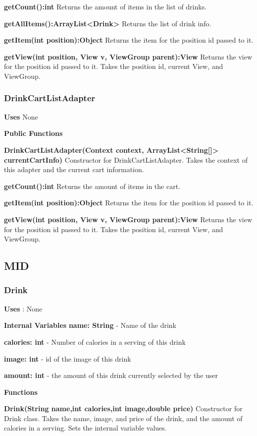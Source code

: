 \documentclass [10pt]{article}
\begin{document}
\textbf{getCount():int}
Returns the amount of items in the list of drinks.

\textbf{getAllItems():ArrayList<Drink>}
Returns the list of drink info.

\textbf{getItem(int position):Object}
Returns the item for the position id passed to it.

\textbf{getView(int position, View v, ViewGroup parent):View}
Returns the view for the position id passed to it. Takes the position id, current View, and ViewGroup.

\subsubsection{DrinkCartListAdapter}
\textbf{Uses} None

\textbf{Public Functions}

\textbf{DrinkCartListAdapter(Context context, ArrayList<String[]> currentCartInfo)}
Constructor for DrinkCartListAdapter. Takes the context of this adapter and the current cart information.

\textbf{getCount():int}
Returns the amount of items in the cart.

\textbf{getItem(int position):Object}
Returns the item for the position id passed to it.

\textbf{getView(int position, View v, ViewGroup parent):View}
Returns the view for the position id passed to it. Takes the position id, current View, and ViewGroup.

\subsection{MID}

\subsubsection{Drink}

\textbf{Uses} : None

\textbf{Internal Variables}
\textbf{name: String} - Name of the drink

\textbf{calories: int} - Number of calories in a serving of this drink

\textbf{image: int} - id of the image of this drink

\textbf{amount: int} - the amount of this drink currently selected by the user

\textbf{Functions}

\textbf{Drink(String name,int calories,int image,double price)}
Constructor for Drink class. Takes the name, image, and price of the drink, and the amount of calories in a serving. Sets the internal variable values.
\end{document}
